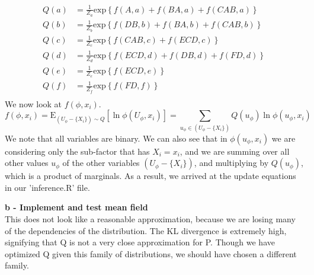\documentclass[12pt]{article}
\begin{document}
\begin{align*}
Q(a) &= \frac{1}{Z_a} \mathrm{exp} \left\lbrace f(A,a) + f(BA,a) + f(CAB,a) \right\rbrace \\
Q(b) &= \frac{1}{Z_b} \mathrm{exp} \left\lbrace f(DB,b) + f(BA,b) + f(CAB,b) \right\rbrace \\
Q(c) &= \frac{1}{Z_c} \mathrm{exp} \left\lbrace f(CAB,c) + f(ECD,c) \right\rbrace \\
Q(d) &= \frac{1}{Z_d} \mathrm{exp} \left\lbrace f(ECD,d) + f(DB,d) + f(FD,d) \right\rbrace \\
Q(e) &= \frac{1}{Z_e} \mathrm{exp} \left\lbrace f(ECD,e) \right\rbrace \\
Q(f) &= \frac{1}{Z_f} \mathrm{exp} \left\lbrace f(FD,f) \right\rbrace \\
\end{align*}
We now look at $f(\phi, x_i)$.
\[
f(\phi, x_i) = \mathrm{E}_{(U_\phi - \lbrace X_i \rbrace) \sim Q} [\ln \phi(U_\phi , x_i)] = \sum_{u_\phi \in (U_\phi - \lbrace X_i \rbrace)} Q(u_\phi) \ln \phi(u_\phi, x_i)
\]
We note that all variables are binary.  We can also see that in $\phi(u_\phi, x_i)$ we are considering only the sub-factor that has $X_i = x_i$, and we are summing over all other values $u_\phi$ of the other variables $(U_\phi - \lbrace X_i \rbrace)$, and multiplying by $Q(u_\phi)$, which is a product of marginals.  As a result, we arrived at the update equations in our 'inference.R' file.

\noindent \textbf{b - Implement and test mean field}\\
This does not look like a reasonable approximation, because we are losing many of the dependencies of the distribution.  The KL divergence is extremely high, signifying that Q is not a very close approximation for P.  Though we have optimized Q given this family of distributions, we should have chosen a different family.\\
\end{document}
